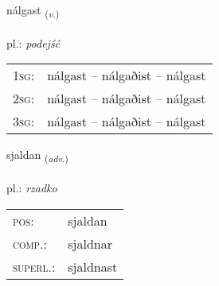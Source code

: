 \documentclass[frontgrid, backgrid]{flacards}\usepackage[]{graphicx}\usepackage[]{xcolor}
\begin{document}
\renewcommand{\flhead}{\vskip5pt \fboxsep=0pt {\small\bfseries\footnotesize Sagnorð | Verb}}
\renewcommand{\fcfoot}{\vskip5pt \fboxsep=0pt \hspace{2pt}{\small\bfseries\footnotesize 2K}}

\renewcommand{\blhead}{\vskip5pt {\small\bfseries\footnotesize Sagnorð | Verb }}
\renewcommand{\bcfoot}{\vskip5pt \hspace{2pt}{\small\bfseries\footnotesize 2K}}


{nálgast \small{\textsubscript{(\textit{v.})}} \\[1ex] %
\textphonetic{[naulkast]} \\
pl.: \emph{podejść} \\  [2ex]
\renewcommand*{\arraystretch}{0.8}
\begin{tabular}{p{1cm}l}
\textsc{1sg}: & nálgast -- nálgaðist -- nálgast \\ 
\textsc{2sg}: & nálgast -- nálgaðist -- nálgast \\ 
\textsc{3sg}: & nálgast -- nálgaðist -- nálgast \\ 
\end{tabular}
}

\renewcommand{\flhead}{\vskip5pt \fboxsep=0pt {\small\bfseries\footnotesize Atviksorð | Adverb}}
\renewcommand{\fcfoot}{\vskip5pt \fboxsep=0pt \hspace{2pt}{\small\bfseries\footnotesize 2K}}

\renewcommand{\blhead}{\vskip5pt {\small\bfseries\footnotesize Atviksorð | Adverb }}
\renewcommand{\bcfoot}{\vskip5pt \hspace{2pt}{\small\bfseries\footnotesize 2K}}


{sjaldan \small{\textsubscript{(\textit{adv.})}} \\[1ex] %
\textphonetic{[sjaltan]} \\
pl.: \emph{rzadko} \\  [2ex]
\renewcommand*{\arraystretch}{0.8}
\begin{tabular}{ll}
\textsc{pos}: & sjaldan \\ 
\textsc{comp.}: & sjaldnar \\ 
\textsc{superl.}: & sjaldnast \\
\end{tabular}
}
\end{document}
